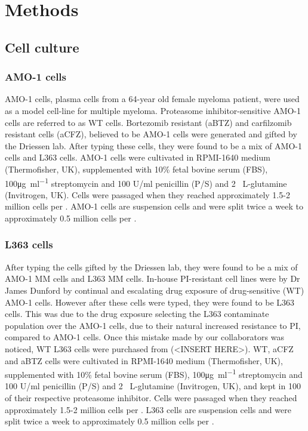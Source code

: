 \chapter{\label{ch:3-methods}Methods}


\section{Cell culture}
\subsection{AMO-1 cells}
AMO-1 cells, plasma cells from a 64-year old female myeloma patient, were used as a model cell-line for multiple myeloma.
Proteasome inhibitor-sensitive AMO-1 cells are referred to as WT cells.
Bortezomib resistant (aBTZ) and carfilzomib resistant cells (aCFZ), believed to be AMO-1 cells were generated and gifted by the Driessen lab\cite{soriano2016proteasome}.
After typing these cells, they were found to be a mix of AMO-1 cells and L363 cells.
AMO-1 cells were cultivated in RPMI-1640 medium (Thermofisher, UK), supplemented with 10\% fetal bovine serum (FBS), 100\si{\ug\per\ml} streptomycin and 100 U/ml penicillin (P/S) and 2\si{\milli\Molar} L-glutamine (Invitrogen, UK).
Cells were passaged when they reached approximately 1.5-2 million cells per \ml{}.
AMO-1 cells are suspension cells and were split twice a week to approximately 0.5 million cells per \ml{}.

\subsection{L363 cells}
After typing the cells gifted by the Driessen lab, they were found to be a mix of AMO-1 MM cells and L363 MM cells.
In-house PI-resistant cell lines were by Dr James Dunford by continual and escalating drug exposure of drug-sensitive (WT) AMO-1 cells.
However after these cells were typed, they were found to be L363 cells.
This was due to the drug exposure selecting the L363 contaminate population over the AMO-1 cells, due to their natural increased resistance to PI, compared to AMO-1 cells.
Once this mistake made by our collaborators was noticed, WT L363 cells were purchased from (<INSERT HERE>).
WT, aCFZ and aBTZ cells were cultivated in RPMI-1640 medium (Thermofisher, UK), supplemented with 10\% fetal bovine serum (FBS), 100\si{\ug\per\ml} streptomycin and 100 U/ml penicillin (P/S) and 2\si{\milli\Molar} L-glutamine (Invitrogen, UK), and kept in 100\si{\nano\Molar} of their respective proteasome inhibitor.
Cells were passaged when they reached approximately 1.5-2 million cells per \ml{}.
L363 cells are suspension cells and were split twice a week to approximately 0.5 million cells per \ml{}.

